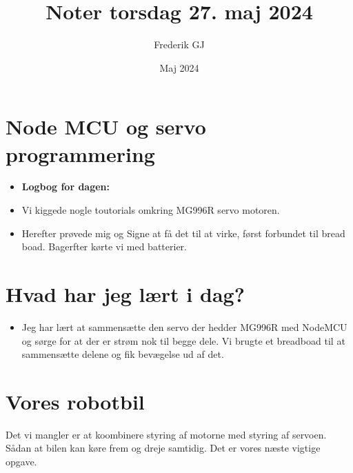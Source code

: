 \documentclass{article}
\title{Noter torsdag 27. maj 2024}
\author{Frederik GJ}
\date{Maj 2024}
\begin{document}
\maketitle

\section{Node MCU og servo programmering}

\begin{itemize}
    \item \textbf{Logbog for dagen:}
    \item Vi kiggede nogle toutorials omkring MG996R servo motoren. 
    \item Herefter prøvede mig og Signe at få det til at virke, først forbundet til bread boad. Bagerfter kørte vi med batterier. 
\end{itemize}

\section{Hvad har jeg lært i dag?}
\begin{itemize}
    \item Jeg har lært at sammensætte den servo der hedder MG996R med NodeMCU og sørge for at der er strøm nok til begge dele. Vi brugte et breadboad til at sammensætte delene og fik bevægelse ud af det. 
\end{itemize}

\section{Vores robotbil}
Det vi mangler er at koombinere styring af motorne med styring af servoen. Sådan at bilen kan køre frem og dreje samtidig. Det er vores næste vigtige opgave. 
\end{document}
